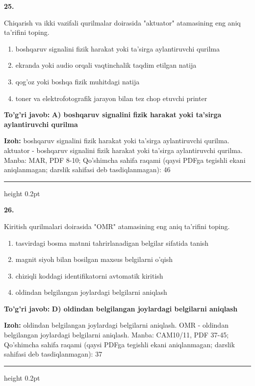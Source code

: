 \documentclass[10pt,a4paper]{article}
\begin{document}
{\bfseries\sffamily\color{ink} 25.}
\par
Chiqarish va ikki vazifali qurilmalar doirasida "aktuator" atamasining eng aniq ta'rifini toping.
\begin{enumerate}[label=\Alph*),leftmargin=9mm]
\item boshqaruv signalini fizik harakat yoki ta'sirga aylantiruvchi qurilma
\item ekranda yoki audio orqali vaqtinchalik taqdim etilgan natija
\item qog'oz yoki boshqa fizik muhitdagi natija
\item toner va elektrofotografik jarayon bilan tez chop etuvchi printer
\end{enumerate}
\begin{tcolorbox}[enhanced,breakable,colback=teal!4,colframe=teal!60!black,boxrule=0.45pt,arc=1.2mm,left=2.7mm,right=2.7mm,top=1.8mm,bottom=1.8mm,before skip=2mm,after skip=2mm]
{\bfseries\sffamily\color{teal}To'g'ri javob:} \textbf{A) boshqaruv signalini fizik harakat yoki ta'sirga aylantiruvchi qurilma}
\par\smallskip
{\bfseries Izoh:} boshqaruv signalini fizik harakat yoki ta'sirga aylantiruvchi qurilma. aktuator - boshqaruv signalini fizik harakat yoki ta'sirga aylantiruvchi qurilma. Manba: MAR, PDF 8-10; Qo'shimcha sahifa raqami (qaysi PDFga tegishli ekani aniqlanmagan; darslik sahifasi deb tasdiqlanmagan): 46
\end{tcolorbox}
\vspace{2mm}\hrule height 0.2pt\vspace{3mm}

{\bfseries\sffamily\color{ink} 26.}
\par
Kiritish qurilmalari doirasida "OMR" atamasining eng aniq ta'rifini toping.
\begin{enumerate}[label=\Alph*),leftmargin=9mm]
\item tasvirdagi bosma matnni tahrirlanadigan belgilar sifatida tanish
\item magnit siyoh bilan bosilgan maxsus belgilarni o'qish
\item chiziqli koddagi identifikatorni avtomatik kiritish
\item oldindan belgilangan joylardagi belgilarni aniqlash
\end{enumerate}
\begin{tcolorbox}[enhanced,breakable,colback=teal!4,colframe=teal!60!black,boxrule=0.45pt,arc=1.2mm,left=2.7mm,right=2.7mm,top=1.8mm,bottom=1.8mm,before skip=2mm,after skip=2mm]
{\bfseries\sffamily\color{teal}To'g'ri javob:} \textbf{D) oldindan belgilangan joylardagi belgilarni aniqlash}
\par\smallskip
{\bfseries Izoh:} oldindan belgilangan joylardagi belgilarni aniqlash. OMR - oldindan belgilangan joylardagi belgilarni aniqlash. Manba: CAM10/11, PDF 37-45; Qo'shimcha sahifa raqami (qaysi PDFga tegishli ekani aniqlanmagan; darslik sahifasi deb tasdiqlanmagan): 37
\end{tcolorbox}
\vspace{2mm}\hrule height 0.2pt\vspace{3mm}
\end{document}
